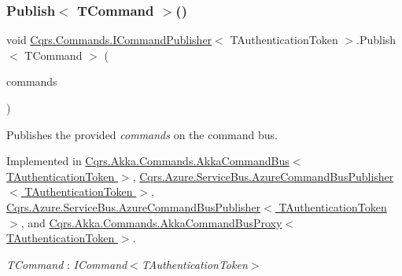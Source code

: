 \subsubsection{\texorpdfstring{Publish$<$ T\+Command $>$()}{Publish< TCommand >()}\hspace{0.1cm}{\footnotesize\ttfamily [2/2]}}
{\footnotesize\ttfamily void \hyperlink{interfaceCqrs_1_1Commands_1_1ICommandPublisher}{Cqrs.\+Commands.\+I\+Command\+Publisher}$<$ T\+Authentication\+Token $>$.Publish$<$ T\+Command $>$ (\begin{DoxyParamCaption}\item[{I\+Enumerable$<$ T\+Command $>$}]{commands }\end{DoxyParamCaption})}



Publishes the provided {\itshape commands}  on the command bus. 



Implemented in \hyperlink{classCqrs_1_1Akka_1_1Commands_1_1AkkaCommandBus_ab52365375febd74ac078e97af6e6cd24}{Cqrs.\+Akka.\+Commands.\+Akka\+Command\+Bus$<$ T\+Authentication\+Token $>$}, \hyperlink{classCqrs_1_1Azure_1_1ServiceBus_1_1AzureCommandBusPublisher_a072f18c8709e0ae61056e34251afc506}{Cqrs.\+Azure.\+Service\+Bus.\+Azure\+Command\+Bus\+Publisher$<$ T\+Authentication\+Token $>$}, \hyperlink{classCqrs_1_1Azure_1_1ServiceBus_1_1AzureCommandBusPublisher_a072f18c8709e0ae61056e34251afc506}{Cqrs.\+Azure.\+Service\+Bus.\+Azure\+Command\+Bus\+Publisher$<$ T\+Authentication\+Token $>$}, and \hyperlink{classCqrs_1_1Akka_1_1Commands_1_1AkkaCommandBusProxy_a81dc8162ca933d84b6aee04aff589010}{Cqrs.\+Akka.\+Commands.\+Akka\+Command\+Bus\+Proxy$<$ T\+Authentication\+Token $>$}.

\begin{Desc}
\item[Type Constraints]\begin{description}
\item[{\em T\+Command} : {\em I\+Command$<$T\+Authentication\+Token$>$}]\end{description}
\end{Desc}
